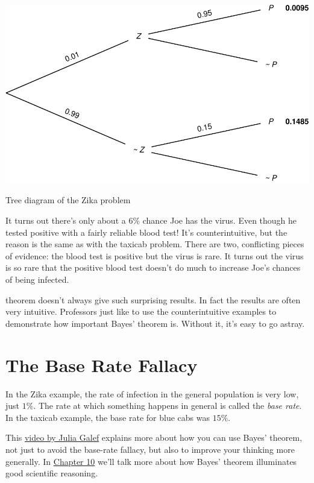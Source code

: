 \documentclass[justified]{tufte-book}
\theoremstyle{definition}
\theoremstyle{definition}
\theoremstyle{definition}
\theoremstyle{definition}
\theoremstyle{remark}
\begin{document}
\begin{marginfigure}
\includegraphics{_main_files/figure-latex/zikatree-1} \caption[Tree diagram of the Zika problem]{Tree diagram of the Zika problem}\label{fig:zikatree}
\end{marginfigure}

It turns out there's only about a \(6\%\) chance Joe has the virus. Even though he tested positive with a fairly reliable blood test! It's counterintuitive, but the reason is the same as with the taxicab problem. There are two, conflicting pieces of evidence: the blood test is positive but the virus is rare. It turns out the virus is so rare that the positive blood test doesn't do much to increase Joe's chances of being infected.

 theorem doesn't always give such surprising results. In fact the results are often very intuitive. Professors just like to use the counterintuitive examples to demonstrate how important Bayes' theorem is. Without it, it's easy to go astray.

\hypertarget{baserate}{%
\section{The Base Rate Fallacy}\label{baserate}}

In the Zika example, the rate of infection in the general population is very low, just \(1\%\). The rate at which something happens in general is called the \emph{base rate}. In the taxicab example, the base rate for blue cabs was \(15\%\).

\begin{marginfigure}
This \href{https://www.youtube.com/watch?v=BrK7X_XlGB8}{video by Julia
Galef} explains more about how you can use Bayes' theorem, not just to
avoid the base-rate fallacy, but also to improve your thinking more
generally. In \protect\hyperlink{bayesibe}{Chapter 10} we'll talk more
about how Bayes' theorem illuminates good scientific reasoning.
\end{marginfigure}
\end{document}
